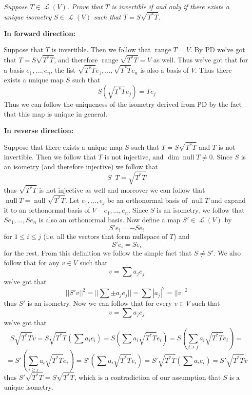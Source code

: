 \documentclass[11pt,oneside,titlepage]{book}
\DeclareMathOperator \map {\mathcal {L}}
\DeclareMathOperator \ns {null}
\DeclareMathOperator \range {range}
\DeclareMathOperator \inv {^{-1}}
\begin{document}
\subsection{}

\textit{Suppose $T \in \map(V)$. Prove that $T$ is invertible if and only if there exists a
  unique isometry $S \in \map(V)$ such that $T = S \sqrt{T^* T}$.}

\textbf{In forward direction: }

Suppose that $T$ is invertible. Then we follow that $\range T = V$. By PD we've got
that $T = S \sqrt{T^* T}$, and therefore $\range \sqrt{T^* T} = V$ as well. Thus we've
got that for a basis $e_1, ..., e_n$, the list $ \sqrt{T^* T}e_1, ...,  \sqrt{T^* T}e_n$ is also
a basis of $V$.
Thus there exists a unique map $S$ such that 
$$ S (\sqrt{T^* T} e_j) = T e_j$$
Thus we can follow the uniqueness of the isometry derived from PD by the
fact that this map is unique in general.

\textbf{In reverse direction: }

Suppose that there exists a unique map $S$ such that $T = S \sqrt{T^* T}$ and $T$ is not
invertible. Then we follow that $T$ is not injective, and $\dim \ns T \neq 0$. Since $S$
is an isometry (and therefore injective) we follow that
$$S \inv T = \sqrt{T^* T}$$
thus $\sqrt{T^* T}$ is not injective as well and moreover we can follow that
$\ns T = \ns \sqrt{T^* T}$. 
Let $e_1, ..., e_j$
be an orthonormal basis of $\ns T$ and expand it to an orthonormal basis of $V$ -- $e_1, ..., e_n$.
Since $S$ is an isometry, we follow that $S e_1, ..., S e_n$ is also an orthonormal basis.
Now define a map  $S' \in \map(V)$  by 
$$S' e_i = - Se_i$$
for $1 \leq i \leq j$ (i.e. all the vectors that form nullspace of $T$) and
$$S' e_i = Se_i$$
for the rest. From this definition we follow the simple fact that $S \neq S'$. We also
follow that for any $v \in V$ such that
$$v = \sum a_j e_j$$
we've got that
$$||S'v||^2 = || \sum \pm a_j e_j|| = \sum |a_j|^2 = ||v||^2$$
thus $S'$ is an isometry. Now we can follow that for every $v \in V$ such that
$$v = \sum a_j e_j$$
we've got that
$$S\sqrt{T^* T} v = S\sqrt{T^* T} (\sum a_i e_i) = S (\sum a_i \sqrt{T^* T} e_i) =
S (\sum_{i \geq j} {a_i \sqrt{T^* T} e_i}) =  $$
$$ = S' (\sum_{i \geq j} {a_i \sqrt{T^* T} e_i}) =
S' (\sum {a_i \sqrt{T^* T} e_i}) = S'\sqrt{T^* T} (\sum a_i e_i) = S'\sqrt{T^* T} v $$
thus $S'\sqrt{T^* T} = S\sqrt{T^* T}$, which is a contradiction of our assumption that
$S$ is a unique isometry.

\subsection{}
\end{document}
